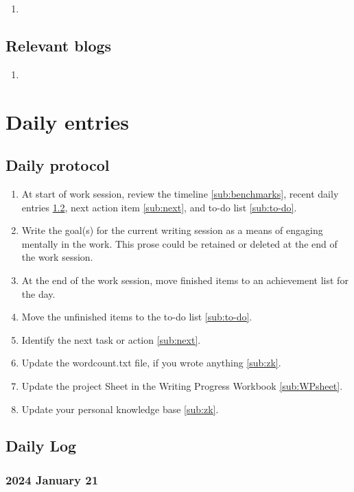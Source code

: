 \documentclass[10pt,letterpaper]{article}
\newcommand{\be}{\begin{enumerate}}
\newcommand{\ee}{\end{enumerate}}
\begin{document}
\be
\item 
\ee

\subsection*{Relevant blogs}

\be
\item 
\ee



\section{Daily entries}
\label{sec:dailyEntries}

\subsection{Daily protocol}
\label{sub:entry-protocol}

\be
\item At start of work session, review the timeline \ref{sub:benchmarks}, recent daily entries \ref{sub:daily-log}, next action item \ref{sub:next}, and to-do list \ref{sub:to-do}.
\item Write the goal(s) for the current writing session as a means of engaging mentally in the work. This prose could be retained or deleted at the end of the work session.
\item At the end of the work session, move finished items to an achievement list for the day.
\item Move the unfinished items to the to-do list \ref{sub:to-do}.
\item Identify the next task or action \ref{sub:next}.
\item Update the wordcount.txt file, if you wrote anything \ref{sub:zk}.
\item Update the project Sheet in the Writing Progress Workbook \ref{sub:WPsheet}.
\item Update your personal knowledge base \ref{sub:zk}.
\ee


\subsection{Daily Log}
\label{sub:daily-log}


\subsubsection{2024 January 21}
\end{document}
